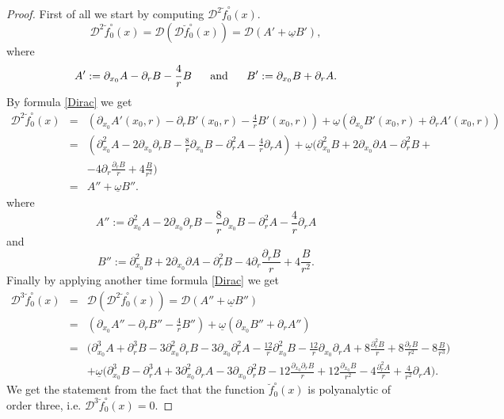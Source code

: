 \documentclass[reqno,11pt]{amsart}
\numberwithin{equation}{section}
\theoremstyle{definition}
\begin{document}
\begin{proof}
First of all we start by computing $\mathcal{D}^2\breve{f}^{\circ}_0(x)$.
$$ \mathcal{D}^2 \breve{f}^{\circ}_0(x)= \mathcal{D}(\mathcal{D}\breve{f}^{\circ}_0(x))= \mathcal{D}(A'+ \underline{\omega}B'),$$
where
$$ A':= \partial_{x_0} A- \partial_{r} B- \frac{4}{r} B\ \ \ \ \ {\rm and} \ \ \ \ \
 B':= \partial_{x_0} B+ \partial_r A.
 $$
By formula \eqref{Dirac} we get
\begin{eqnarray}
\label{zeros4}
\nonumber
\mathcal{D}^2 \breve{f}^{\circ}_0(x)&=& \left(\partial_{x_0}A'(x_0,r)- \partial_r B'(x_0,r)- \frac{4}{r} B'(x_0,r)\right)+ \underline{\omega} \left(\partial_{x_0}B'(x_0,r)+ \partial_r A'(x_0,r)\right)\\
\nonumber
&=& \left(\partial_{x_0}^2 A-2 \partial_{x_0}\partial_r B - \frac{8}{r} \partial_{x_0}B- \partial_r^2A- \frac{4}{r} \partial_r A\right)+ \underline{\omega} \biggl(\partial_{x_0}^2 B+2 \partial_{x_0}\partial A- \partial_r^2B+\\
&&- 4 \partial_r \frac{\partial_r B}{r}+ 4 \frac{B}{r^2} \biggl)\\
\nonumber
&=& A''+ \underline{\omega} B''.
\end{eqnarray}
where
$$ A'':=\partial_{x_0}^2 A-2 \partial_{x_0}\partial_r B - \frac{8}{r} \partial_{x_0}B- \partial_r^2A- \frac{4}{r} \partial_r A$$
and
$$ B'':=\partial_{x_0}^2 B+2 \partial_{x_0}\partial A- \partial_r^2B- 4 \partial_r \frac{\partial_r B}{r}+ 4 \frac{B}{r^2}.$$
Finally by applying another time formula \eqref{Dirac} we get
\begin{eqnarray*}
\mathcal{D}^3 \breve{f}^{\circ}_0(x)&=& \mathcal{D}(\mathcal{D}^2 \breve{f}^{\circ}_0(x))=\mathcal{D}(A''+ \underline{\omega} B'')\\
&=& \left(\partial_{x_0}A''- \partial_r B''- \frac{4}{r} B''\right)+ \underline{\omega} (\partial_{x_0}B''+ \partial_r A'')\\
&=& \biggl( \partial_{x_0}^3A+\partial_r^3 B-3 \partial_{x_0}^2 \partial_r B-3 \partial_{x_0} \partial_r^2A-\frac{12}{r}  \partial_{x_0}^2 B- \frac{12}{r} \partial_{x_0}\partial_{r} A+ 8 \frac{\partial_r^2 B}{r}+8 \frac{\partial_r B}{r^2}-8\frac{B}{r^3}\biggl)\\
&& + \underline{\omega} \biggl(\partial_{x_0}^3 B- \partial_{r}^3 A +3 \partial_{x_0}^2 \partial_{r} A -3 \partial_{x_0} \partial_{r}^2 B- 12 \frac{\partial_{x_0} \partial_{r}B}{r}+12 \frac{\partial_{x_0} B}{r^2}-4 \frac{\partial_{r}^2 A}{r} + \frac{4}{r^2}\partial_r A\biggl).
\end{eqnarray*}
We get the statement from the fact that the function $\breve{f}^{\circ}_0(x)$ is polyanalytic of order three, i.e. $\mathcal{D}^3 \breve{f}^{\circ}_0(x)=0.$
\end{proof}
\end{document}

